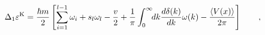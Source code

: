 \begin{equation}
\Delta_1\varepsilon^{\rm K}=\frac{\hbar
m}{2}\left[\sum_{i=1}^{l-1}\omega_i+s_l \omega_l
-\frac{v}{2}+\frac{1}{\pi}\int_0^\infty \!\! dk
\frac{d\delta(k)}{dk}\omega(k)-\frac{\left<V(x)\right>}{2\pi}\right]\qquad
, \label{one2}
\end{equation}

